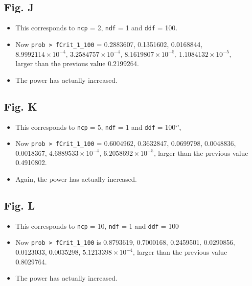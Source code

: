 \documentclass[
]{book}
\providecommand{\tightlist}{%
  \setlength{\itemsep}{0pt}\setlength{\parskip}{0pt}}
\begin{document}
\hypertarget{fig.-j}{%
\subsection{Fig. J}\label{fig.-j}}

\begin{itemize}
\tightlist
\item
  This corresponds to \texttt{ncp} = 2, \texttt{ndf} = 1 and \texttt{ddf} = 100.
\item
  Now \texttt{prob\ \textgreater{}\ fCrit\_1\_100} = 0.2883607, 0.1351602, 0.0168844, \ensuremath{8.9992114\times 10^{-4}}, \ensuremath{3.2584757\times 10^{-4}}, \ensuremath{8.1619807\times 10^{-5}}, \ensuremath{1.1084132\times 10^{-5}}, larger than the previous value 0.2199264.
\item
  The power has actually increased.
\end{itemize}

\hypertarget{fig.-k}{%
\subsection{Fig. K}\label{fig.-k}}

\begin{itemize}
\tightlist
\item
  This corresponds to \texttt{ncp} = 5, \texttt{ndf} = 1 and \texttt{ddf} = 100`',
\item
  Now \texttt{prob\ \textgreater{}\ fCrit\_1\_100} = 0.6004962, 0.3632847, 0.0699798, 0.0048836, 0.0018367, \ensuremath{4.6889533\times 10^{-4}}, \ensuremath{6.2058692\times 10^{-5}}, larger than the previous value 0.4910802.
\item
  Again, the power has actually increased.
\end{itemize}

\hypertarget{fig.-l}{%
\subsection{Fig. L}\label{fig.-l}}

\begin{itemize}
\tightlist
\item
  This corresponds to \texttt{ncp} = 10, \texttt{ndf} = 1 and \texttt{ddf} = 100
\item
  Now \texttt{prob\ \textgreater{}\ fCrit\_1\_100} is 0.8793619, 0.7000168, 0.2459501, 0.0290856, 0.0123033, 0.0035298, \ensuremath{5.1213398\times 10^{-4}}, larger than the previous value 0.8029764.
\item
  The power has actually increased.
\end{itemize}
\end{document}
